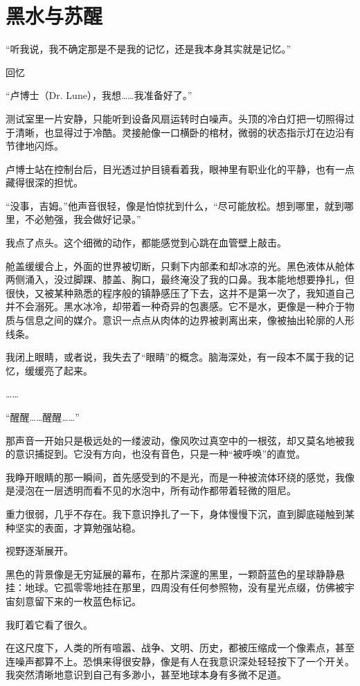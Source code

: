 \chapter{黑水与苏醒}

“听我说，我不确定那是不是我的记忆，还是我本身其实就是记忆。”

回忆

“卢博士（Dr. Lune），我想……我准备好了。”

测试室里一片安静，只能听到设备风扇运转时白噪声。头顶的冷白灯把一切照得过于清晰，也显得过于冷酷。灵接舱像一口横卧的棺材，微弱的状态指示灯在边沿有节律地闪烁。

卢博士站在控制台后，目光透过护目镜看着我，眼神里有职业化的平静，也有一点藏得很深的担忧。

“没事，吉姆。”他声音很轻，像是怕惊扰到什么，“尽可能放松。想到哪里，就到哪里，不必勉强，我会做好记录。”

我点了点头。这个细微的动作，都能感觉到心跳在血管壁上敲击。

舱盖缓缓合上，外面的世界被切断，只剩下内部柔和却冰凉的光。黑色液体从舱体两侧涌入，没过脚踝、膝盖、胸口，最终淹没了我的口鼻。我本能地想要挣扎，但很快，又被某种熟悉的程序般的镇静感压了下去，这并不是第一次了，我知道自己并不会溺死。黑水冰冷，却带着一种奇异的包裹感。它不是水，更像是一种介于物质与信息之间的媒介。意识一点点从肉体的边界被剥离出来，像被抽出轮廓的人形线条。

我闭上眼睛，或者说，我失去了“眼睛”的概念。脑海深处，有一段本不属于我的记忆，缓缓亮了起来。

……

“醒醒……醒醒……”

那声音一开始只是极远处的一缕波动，像风吹过真空中的一根弦，却又莫名地被我的意识捕捉到。它没有方向，也没有音色，只是一种“被呼唤”的直觉。

我睁开眼睛的那一瞬间，首先感受到的不是光，而是一种被流体环绕的感觉，我像是浸泡在一层透明而看不见的水泡中，所有动作都带着轻微的阻尼。

重力很弱，几乎不存在。我下意识挣扎了一下，身体慢慢下沉，直到脚底碰触到某种坚实的表面，才算勉强站稳。

视野逐渐展开。

黑色的背景像是无穷延展的幕布，在那片深邃的黑里，一颗蔚蓝色的星球静静悬挂：地球。它孤零零地挂在那里，四周没有任何参照物，没有星光点缀，仿佛被宇宙刻意留下来的一枚蓝色标记。

我盯着它看了很久。

在这尺度下，人类的所有喧嚣、战争、文明、历史，都被压缩成一个像素点，甚至连噪声都算不上。恐惧来得很安静，像是有人在我意识深处轻轻按下了一个开关。我突然清晰地意识到自己有多渺小，甚至地球本身有多微不足道。

